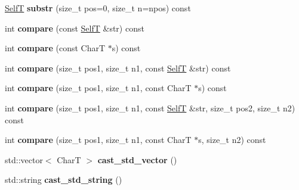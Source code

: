 \begin{CompactItemize}
\item 
\hypertarget{classbbt__string_b79ed106ffa94ed529c8697745f8d1f5}{
\hyperlink{classbbt__string}{SelfT} \textbf{substr} (size\_\-t pos=0, size\_\-t n=npos) const }
\label{classbbt__string_b79ed106ffa94ed529c8697745f8d1f5}

\item 
\hypertarget{classbbt__string_578af910a50c78cee9fe2466706585c1}{
int \textbf{compare} (const \hyperlink{classbbt__string}{SelfT} \&str) const }
\label{classbbt__string_578af910a50c78cee9fe2466706585c1}

\item 
\hypertarget{classbbt__string_7462a0602d3d92f1c6890cf103ff9212}{
int \textbf{compare} (const CharT $\ast$s) const }
\label{classbbt__string_7462a0602d3d92f1c6890cf103ff9212}

\item 
\hypertarget{classbbt__string_a7004ab01cd6195d39e85147ea8c5e70}{
int \textbf{compare} (size\_\-t pos1, size\_\-t n1, const \hyperlink{classbbt__string}{SelfT} \&str) const }
\label{classbbt__string_a7004ab01cd6195d39e85147ea8c5e70}

\item 
\hypertarget{classbbt__string_b4dbafa5ee92a4dd63b80a72902dc5bf}{
int \textbf{compare} (size\_\-t pos1, size\_\-t n1, const CharT $\ast$s) const }
\label{classbbt__string_b4dbafa5ee92a4dd63b80a72902dc5bf}

\item 
\hypertarget{classbbt__string_a5e131e7b10e9b328342db4ea84cd06f}{
int \textbf{compare} (size\_\-t pos1, size\_\-t n1, const \hyperlink{classbbt__string}{SelfT} \&str, size\_\-t pos2, size\_\-t n2) const }
\label{classbbt__string_a5e131e7b10e9b328342db4ea84cd06f}

\item 
\hypertarget{classbbt__string_f075976f6dced8212dae05bd93d1bd6f}{
int \textbf{compare} (size\_\-t pos1, size\_\-t n1, const CharT $\ast$s, size\_\-t n2) const }
\label{classbbt__string_f075976f6dced8212dae05bd93d1bd6f}

\item 
\hypertarget{classbbt__string_69eda47adb2a63bd256be0ac4d5c2f9e}{
std::vector$<$ CharT $>$ \textbf{cast\_\-std\_\-vector} ()}
\label{classbbt__string_69eda47adb2a63bd256be0ac4d5c2f9e}

\item 
\hypertarget{classbbt__string_4bc98508bba816f2848e2c134fd31108}{
std::string \textbf{cast\_\-std\_\-string} ()}
\label{classbbt__string_4bc98508bba816f2848e2c134fd31108}


\end{CompactItemize}

